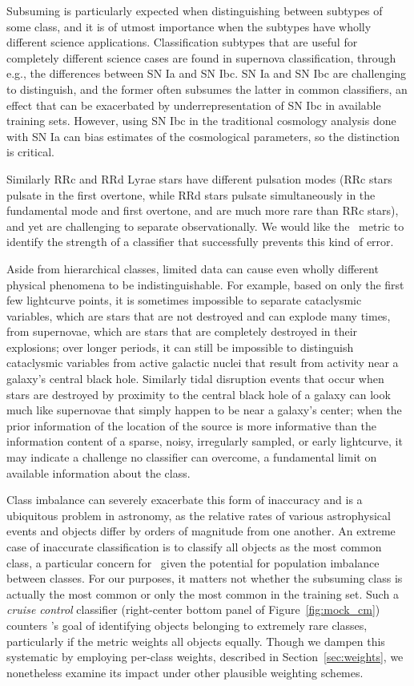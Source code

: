 Subsuming is particularly expected when distinguishing between subtypes of some class, and it is of utmost importance when the subtypes have wholly different science applications.
Classification subtypes that are useful for completely different science cases are found in supernova classification, through e.g., the differences between SN Ia and SN Ibc.
SN Ia and SN Ibc are challenging to distinguish, and the former often subsumes the latter in common classifiers, an effect that can be exacerbated by underrepresentation of SN Ibc in available training sets.
However, using SN Ibc in the traditional cosmology analysis done with SN Ia can bias estimates of the cosmological parameters, so the distinction is critical.

Similarly RRc and RRd Lyrae stars have different pulsation modes (RRc stars pulsate in the first overtone, while RRd stars pulsate simultaneously in the fundamental mode and first overtone, and are much more rare than RRc stars), and yet are challenging to separate observationally.
We would like the \plasticc\ metric to identify the strength of a classifier that successfully prevents this kind of error.

Aside from hierarchical classes, limited data can cause even wholly different physical phenomena to be indistinguishable.
For example, based on only the first few lightcurve points, it is sometimes impossible to separate cataclysmic variables, which are stars that are not destroyed and can explode many times, from supernovae, which are stars that are completely destroyed in their explosions; over longer periods, it can still be impossible to distinguish cataclysmic variables from active galactic nuclei that result from activity near a galaxy's central black hole.
Similarly tidal disruption events that occur when stars are destroyed by proximity to the central black hole of a galaxy can look much like supernovae that simply happen to be near a galaxy's center; when the prior information of the location of the source is more informative than the information content of a sparse, noisy, irregularly sampled, or early lightcurve, it may indicate a challenge no classifier can overcome, a fundamental limit on available information about the class.

Class imbalance can severely exacerbate this form of inaccuracy and is a ubiquitous problem in astronomy, as the relative rates of various astrophysical events and objects differ by orders of magnitude from one another.
An extreme case of inaccurate classification is to classify all objects as the most common class, a particular concern for \plasticc\ given the potential for population imbalance between classes.
For our purposes, it matters not whether the subsuming class is actually the most common or only the most common in the training set.
Such a \textit{cruise control} classifier (right-center bottom panel of Figure~\ref{fig:mock_cm}) counters \plasticc's goal of identifying objects belonging to extremely rare classes, particularly if the metric weights all objects equally.
Though we dampen this systematic by employing per-class weights, described in Section~\ref{sec:weights}, we nonetheless examine its impact under other plausible weighting schemes.

